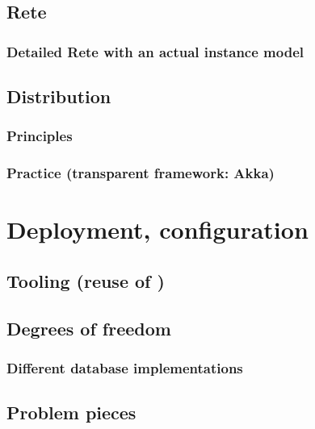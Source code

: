 \subsection{Rete}

\subsubsection{Detailed Rete with an actual instance model}



\subsection{Distribution}

\subsubsection{Principles}

\subsubsection{Practice (transparent framework: Akka)}

\section{Deployment, configuration}

\subsection{Tooling (reuse of \eiq)}


\subsection{Degrees of freedom}

\subsubsection{Different database implementations}

\subsection{Problem pieces}

